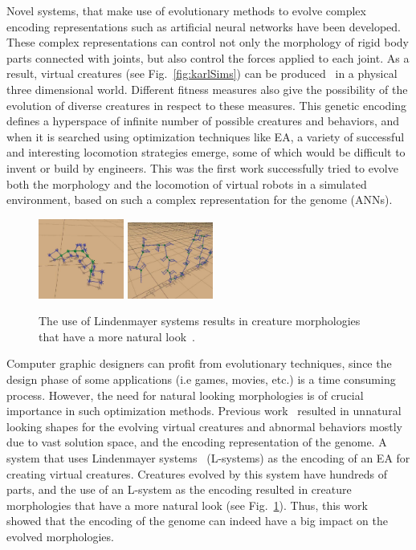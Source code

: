 Novel systems, that make use of evolutionary methods to evolve complex encoding representations such as artificial neural networks have been developed. These complex representations can control not only the morphology of rigid body parts connected with joints, but also control the forces applied to each joint. As a result, virtual creatures (see Fig.~\ref{fig:karlSims}) can be produced~\citep{sims1994evolving} in a physical three dimensional world. Different fitness measures also give the possibility of the evolution of diverse creatures in respect to these measures. This genetic encoding defines a hyperspace of infinite number of possible creatures and behaviors, and when it is searched using optimization techniques like EA, a variety of successful and interesting locomotion strategies emerge, some of which would be difficult to invent or build by engineers. This was the first work successfully tried to evolve both the morphology and the locomotion of virtual robots in a simulated environment, based on such a complex representation for the genome (ANNs).

\begin{figure}[t!]
\centering
\includegraphics[width=0.25\textwidth,height=0.2\textwidth]{../Figures/Misc/lsystems1.png}
\includegraphics[width=0.25\textwidth,height=0.2\textwidth]{../Figures/Misc/lsystems2.png}
\caption{The use of Lindenmayer systems results in creature morphologies that have a more natural look~\citep{hornby2001evolving}.}
\label{fig:lsystems}
\end{figure}

Computer graphic designers can profit from evolutionary techniques, since the design phase of some applications (i.e games, movies, etc.) is a time consuming process. However, the need for natural looking morphologies is of crucial importance in such optimization methods. Previous work~\citep{lipson2000automatic,sims1994evolving} resulted in unnatural looking shapes for the evolving virtual creatures and abnormal behaviors mostly due to vast solution space, and the encoding representation of the genome. A system that uses Lindenmayer systems~\citep{hornby2001evolving} (L-systems) as the encoding of an EA for creating virtual creatures. Creatures evolved by this system have hundreds of parts, and the use of an L-system as the encoding resulted in creature morphologies that have a more natural look (see Fig.~\ref{fig:lsystems}). Thus, this work~\citep{hornby2001evolving} showed that the encoding of the genome can indeed have a big impact on the evolved morphologies.

